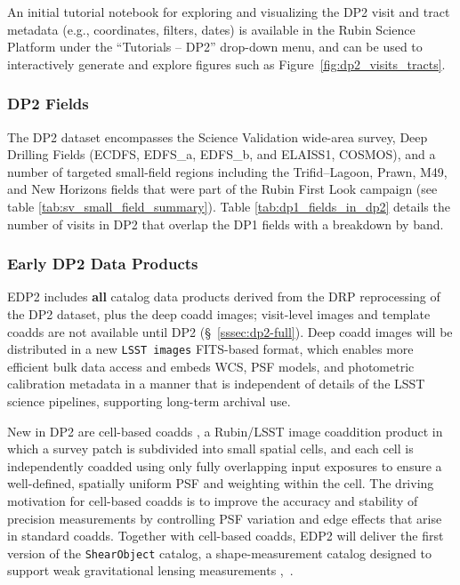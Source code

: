 An initial tutorial notebook for exploring and visualizing the DP2 visit and tract metadata (e.g., coordinates, filters, dates) is available in the Rubin Science Platform under the ``Tutorials -- DP2'' drop-down menu, and can be used to interactively generate and explore figures such as Figure~\ref{fig:dp2_visits_tracts}.

\subsubsection{DP2 Fields}
The DP2 dataset encompasses the Science Validation wide-area survey,  Deep Drilling Fields (ECDFS, EDFS\_a, EDFS\_b, and ELAISS1, COSMOS), and a number of targeted small-field regions including the Trifid--Lagoon, Prawn, M49, and New Horizons fields that were part of the Rubin First Look campaign (see table \ref{tab:sv_small_field_summary}).
Table \ref{tab:dp1_fields_in_dp2} details the number of visits in DP2 that overlap the DP1 fields with a breakdown by band.


\subsubsection{Early DP2 Data Products}
\label{sssec:edp2}

EDP2 includes \textbf{all} catalog data products derived from the DRP reprocessing of the DP2 dataset, plus the deep coadd images; visit-level images and template coadds are not available until DP2 (\S~\ref{sssec:dp2-full}).
Deep coadd images will be distributed in a new \texttt{LSST images} FITS-based format, which enables more efficient bulk data access and embeds WCS, PSF models, and photometric calibration metadata in a manner that is independent of details of the LSST science pipelines, supporting long-term archival use.

New in DP2 are cell-based coadds \citep[][]{DMTN-015, SITCOMTN-137, SITCOMTN-162}, a Rubin/LSST image coaddition product in which a survey patch is subdivided into small spatial cells, and each cell is independently coadded using only fully overlapping input exposures to ensure a well-defined, spatially uniform PSF and weighting within the cell.
The driving motivation for cell-based coadds is to improve the accuracy and stability of precision measurements by controlling PSF variation and edge effects that arise in standard coadds.
Together with cell-based coadds, EDP2 will deliver the first version of the \texttt{ShearObject} catalog, a shape-measurement catalog designed to support weak gravitational lensing measurements \dpdd{},~.

